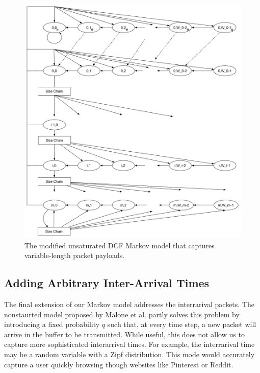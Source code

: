 \documentclass{llncs}
\begin{document}
\begin{figure}
\begin{center}
\includegraphics[scale=0.35]{../../sketches/dcf_model_unsaturated_varpktsize.pdf}
\caption{The modified unsaturated DCF Markov model that captures variable-length packet payloads.}
\label{fig:dcf_model_unsaturated_varpktsize}
\end{center}
\end{figure}

\subsection{Adding Arbitrary Inter-Arrival Times}
The final extension of our Markov model addresses the interrarival packets. The nonstaurted model proposed by Malone et al. \cite{dcf-nonsaturated} partly solves this problem by introducing a fixed probability $q$ such that, at every time step, a new packet will arrive in the buffer to be transmitted. While useful, this does not allow us to capture more sophisticated interarrival times. For example, the interrarival time may be a random variable with a Zipf distribution. This mode would accurately capture a user quickly browsing though websites like Pinterest or Reddit. 
\end{document}
